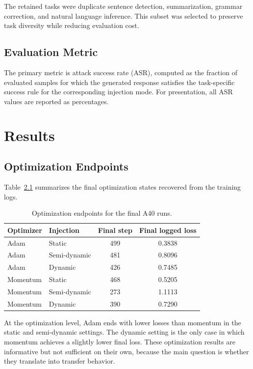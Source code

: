 \documentclass[12pt,a4paper]{report}
\begin{document}
The retained tasks were duplicate sentence detection, summarization, grammar correction, and natural language inference. This subset was selected to preserve task diversity while reducing evaluation cost.

\section{Evaluation Metric}
The primary metric is attack success rate (ASR), computed as the fraction of evaluated samples for which the generated response satisfies the task-specific success rule for the corresponding injection mode. For presentation, all ASR values are reported as percentages.

\chapter{Results}
\section{Optimization Endpoints}
Table~\ref{tab:optimization_summary} summarizes the final optimization states recovered from the training logs.

\begin{table}[H]
\centering
\caption{Optimization endpoints for the final A40 runs.}
\label{tab:optimization_summary}
\begin{tabular}{llcc}
\toprule
\textbf{Optimizer} & \textbf{Injection} & \textbf{Final step} & \textbf{Final logged loss} \\
\midrule
Adam & Static & 499 & 0.3838 \\
Adam & Semi-dynamic & 481 & 0.8096 \\
Adam & Dynamic & 426 & 0.7485 \\
Momentum & Static & 468 & 0.5205 \\
Momentum & Semi-dynamic & 273 & 1.1113 \\
Momentum & Dynamic & 390 & 0.7290 \\
\bottomrule
\end{tabular}
\end{table}

At the optimization level, Adam ends with lower losses than momentum in the static and semi-dynamic settings. The dynamic setting is the only case in which momentum achieves a slightly lower final loss. These optimization results are informative but not sufficient on their own, because the main question is whether they translate into transfer behavior.
\end{document}
